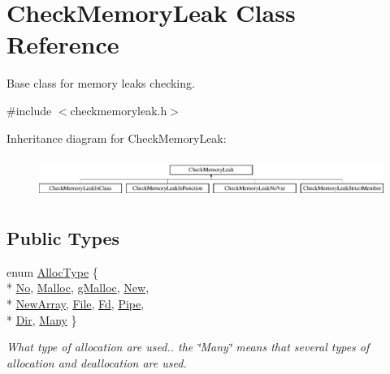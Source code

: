 \hypertarget{class_check_memory_leak}{\section{Check\-Memory\-Leak Class Reference}
\label{class_check_memory_leak}
}


Base class for memory leaks checking.  




{\ttfamily \#include $<$checkmemoryleak.\-h$>$}

Inheritance diagram for Check\-Memory\-Leak\-:\begin{figure}[H]
\begin{center}
\leavevmode
\includegraphics[height=1.346154cm]{class_check_memory_leak}
\end{center}
\end{figure}
\subsection*{Public Types}
\begin{DoxyCompactItemize}
\item 
enum \hyperlink{class_check_memory_leak_ada9e7f7d0af2d8ba771a42d427f51ede}{Alloc\-Type} \{ \\*
\hyperlink{class_check_memory_leak_ada9e7f7d0af2d8ba771a42d427f51edea23f0a641cae8638af7f50f1703d72340}{No}, 
\hyperlink{class_check_memory_leak_ada9e7f7d0af2d8ba771a42d427f51edea078630047e34386181488f4864ba118a}{Malloc}, 
\hyperlink{class_check_memory_leak_ada9e7f7d0af2d8ba771a42d427f51edeae86983884c9f5137c9de5ee9fce4f4ce}{g\-Malloc}, 
\hyperlink{class_check_memory_leak_ada9e7f7d0af2d8ba771a42d427f51edea09084d7a0f5320b3b11eb0a46e430b3c}{New}, 
\\*
\hyperlink{class_check_memory_leak_ada9e7f7d0af2d8ba771a42d427f51edeab10b75ee48eb15d87596f37b0d269710}{New\-Array}, 
\hyperlink{class_check_memory_leak_ada9e7f7d0af2d8ba771a42d427f51edea1f9debdf7f36c72b83a65aef1423811b}{File}, 
\hyperlink{class_check_memory_leak_ada9e7f7d0af2d8ba771a42d427f51edea2e25bac29724b337c5c94211468f0a15}{Fd}, 
\hyperlink{class_check_memory_leak_ada9e7f7d0af2d8ba771a42d427f51edeaaeeb0c5de167985238b16952bce610c1}{Pipe}, 
\\*
\hyperlink{class_check_memory_leak_ada9e7f7d0af2d8ba771a42d427f51edea0e29fce072eff370c3c5613e6401e1b4}{Dir}, 
\hyperlink{class_check_memory_leak_ada9e7f7d0af2d8ba771a42d427f51edeaee3352d96ca8a614e7ea1c3785482894}{Many}
 \}
\begin{DoxyCompactList}\small\item\em What type of allocation are used.. the \char`\"{}\-Many\char`\"{} means that several types of allocation and deallocation are used. \end{DoxyCompactList}\end{DoxyCompactItemize}
